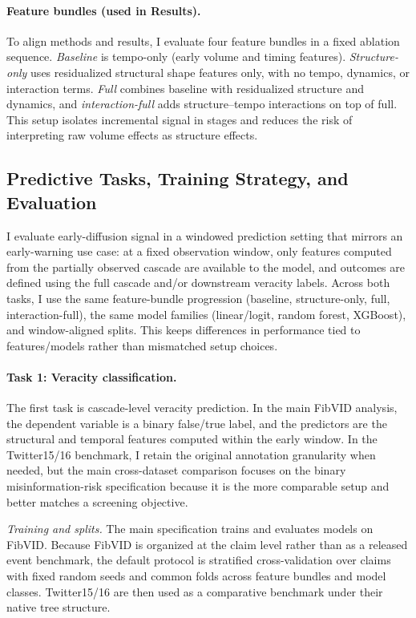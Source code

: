 \paragraph{Feature bundles (used in Results).}
To align methods and results, I evaluate four feature bundles in a fixed ablation sequence. \textit{Baseline} is tempo-only (early volume and timing features). \textit{Structure-only} uses residualized structural shape features only, with no tempo, dynamics, or interaction terms. \textit{Full} combines baseline with residualized structure and dynamics, and \textit{interaction-full} adds structure--tempo interactions on top of full. This setup isolates incremental signal in stages and reduces the risk of interpreting raw volume effects as structure effects.

\subsection{Predictive Tasks, Training Strategy, and Evaluation}
I evaluate early-diffusion signal in a windowed prediction setting that mirrors an early-warning use case: at a fixed observation window, only features computed from the partially observed cascade are available to the model, and outcomes are defined using the full cascade and/or downstream veracity labels. Across both tasks, I use the same feature-bundle progression (baseline, structure-only, full, interaction-full), the same model families (linear/logit, random forest, XGBoost), and window-aligned splits. This keeps differences in performance tied to features/models rather than mismatched setup choices.

\paragraph{Task 1: Veracity classification.}
The first task is cascade-level veracity prediction. In the main FibVID analysis, the dependent variable is a binary false/true label, and the predictors are the structural and temporal features computed within the early window. In the Twitter15/16 benchmark, I retain the original annotation granularity when needed, but the main cross-dataset comparison focuses on the binary misinformation-risk specification because it is the more comparable setup and better matches a screening objective.

\emph{Training and splits.} The main specification trains and evaluates models on FibVID. Because FibVID is organized at the claim level rather than as a released event benchmark, the default protocol is stratified cross-validation over claims with fixed random seeds and common folds across feature bundles and model classes. Twitter15/16 are then used as a comparative benchmark under their native tree structure.

